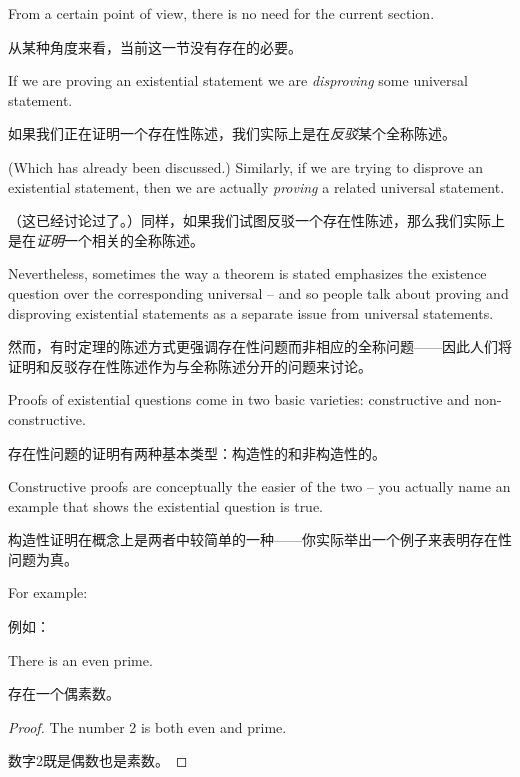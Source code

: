 From a certain point of view, there is no need for the current section.

从某种角度来看，当前这一节没有存在的必要。

If we are proving an existential statement we are \emph{disproving} some
universal statement.

如果我们正在证明一个存在性陈述，我们实际上是在\emph{反驳}某个全称陈述。

(Which has already been discussed.)  Similarly,
if we are trying to disprove an existential statement, then we are
actually \emph{proving} a related universal statement.

（这已经讨论过了。）同样，如果我们试图反驳一个存在性陈述，那么我们实际上是在\emph{证明}一个相关的全称陈述。

Nevertheless,
sometimes the way a theorem is stated emphasizes the existence question
over the corresponding universal -- and so people talk about proving
and disproving existential statements as a separate issue from
universal statements.

然而，有时定理的陈述方式更强调存在性问题而非相应的全称问题——因此人们将证明和反驳存在性陈述作为与全称陈述分开的问题来讨论。

Proofs of existential questions come in two basic varieties: constructive
and non-constructive.

存在性问题的证明有两种基本类型：构造性的和非构造性的。

Constructive proofs are conceptually the easier
of the two -- you actually name an example that shows the existential
question is true.

构造性证明在概念上是两者中较简单的一种——你实际举出一个例子来表明存在性问题为真。

For example:

例如：

\begin{thm}
      There is an even prime.

      存在一个偶素数。
\end{thm}

\begin{proof}
      The number 2 is both even and prime.

      数字2既是偶数也是素数。
\end{proof}

